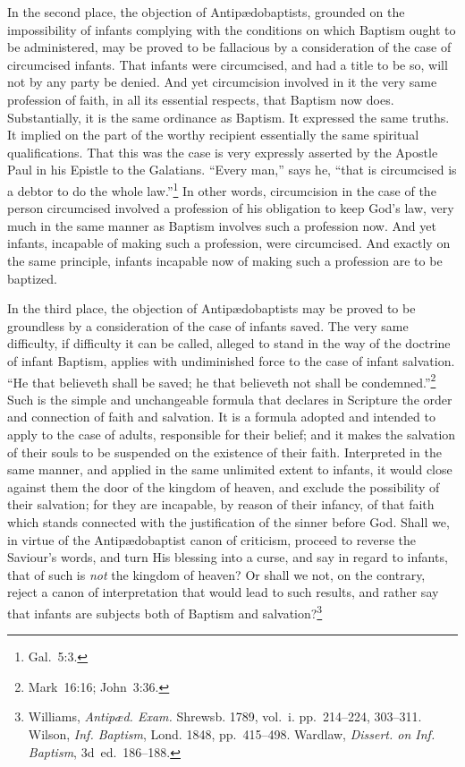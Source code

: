 \documentclass[
]{book}
\begin{document}
In the second place, the objection of Antipædobaptists, grounded on the impossibility of infants complying with the conditions on which Baptism ought to be administered, may be proved to be fallacious by a consideration of the case of circumcised infants. That infants were circumcised, and had a title to be so, will not by any party be denied. And yet circumcision involved in it the very same profession of faith, in all its essential respects, that Baptism now does. Substantially, it is the same ordinance as Baptism. It expressed the same truths. It implied on the part of the worthy recipient essentially the same spiritual qualifications. That this was the case is very expressly asserted by the Apostle Paul in his Epistle to the Galatians. ``Every man,'' says he, ``that is circumcised is a debtor to do the whole law.''\footnote{Gal.~5:3.} In other words, circumcision in the case of the person circumcised involved a profession of his obligation to keep God's law, very much in the same manner as Baptism involves such a profession now. And yet infants, incapable of making such a profession, were circumcised. And exactly on the same principle, infants incapable now of making such a profession are to be baptized.

In the third place, the objection of Antipædobaptists may be proved to be groundless by a consideration of the case of infants saved. The very same difficulty, if difficulty it can be called, alleged to stand in the way of the doctrine of infant Baptism, applies with undiminished force to the case of infant salvation. ``He that believeth shall be saved; he that believeth not shall be condemned.''\footnote{Mark~16:16; John~3:36.} Such is the simple and unchangeable formula that declares in Scripture the order and connection of faith and salvation. It is a formula adopted and intended to apply to the case of adults, responsible for their belief; and it makes the salvation of their souls to be suspended on the existence of their faith. Interpreted in the same manner, and applied in the same unlimited extent to infants, it would close against them the door of the kingdom of heaven, and exclude the possibility of their salvation; for they are incapable, by reason of their infancy, of that faith which stands connected with the justification of the sinner before God. Shall we, in virtue of the Antipædobaptist canon of criticism, proceed to reverse the Saviour's words, and turn His blessing into a curse, and say in regard to infants, that of such is \emph{not} the kingdom of heaven? Or shall we not, on the contrary, reject a canon of interpretation that would lead to such results, and rather say that infants are subjects both of Baptism and salvation?\footnote{Williams, \emph{Antipæd. Exam.} Shrewsb. 1789, vol.~i. pp.~214--224, 303--311. Wilson, \emph{Inf. Baptism}, Lond. 1848, pp.~415--498. Wardlaw, \emph{Dissert. on Inf. Baptism}, 3d~ed.~186--188.}
\end{document}
